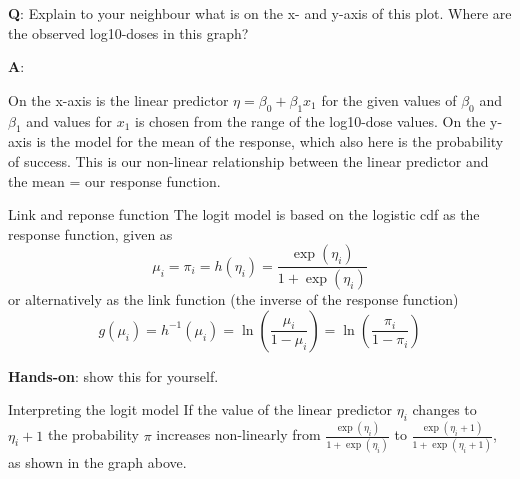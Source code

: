\documentclass[
  ignorenonframetext,
]{beamer}
\begin{document}
\begin{frame}
\textbf{Q}: Explain to your neighbour what is on the x- and y-axis of
this plot. Where are the observed log10-doses in this graph?

\textbf{A}:

On the x-axis is the linear predictor \(\eta=\beta_0+\beta_1 x_1\) for
the given values of \(\beta_0\) and \(\beta_1\) and values for \(x_1\)
is chosen from the range of the log10-dose values. On the y-axis is the
model for the mean of the response, which also here is the probability
of success. This is our non-linear relationship between the linear
predictor and the mean = our response function.
\end{frame}

\begin{frame}
\begin{block}{Link and reponse function}
\protect\hypertarget{link-and-reponse-function}{}
The logit model is based on the logistic cdf as the response function,
given as \[ \mu_i=\pi_i=h(\eta_i)=\frac{\exp(\eta_i)}{1+\exp(\eta_i)}\]
or alternatively as the link function (the inverse of the response
function)
\[ g(\mu_i)=h^{-1}(\mu_i)=\ln(\frac{\mu_i}{1-\mu_i})=\ln(\frac{\pi_i}{1-\pi_i})\]

\textbf{Hands-on}: show this for yourself.
\end{block}
\end{frame}

\begin{frame}
\begin{block}{Interpreting the logit model}
\protect\hypertarget{interpreting-the-logit-model}{}
If the value of the linear predictor \(\eta_i\) changes to \(\eta_i+1\)
the probability \(\pi\) increases non-linearly from
\(\frac{\exp(\eta_i)}{1+\exp(\eta_i)}\) to
\(\frac{\exp(\eta_i+1)}{1+\exp(\eta_i+1)}\), as shown in the graph
above.
\end{block}
\end{frame}
\end{document}
